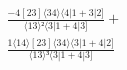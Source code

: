 \documentclass[varwidth, border=5pt]{standalone}
\begin{document}
\begin{my}
$\begin{gathered}
\scriptscriptstyle\frac{-4[23]⟨34⟩⟨4|1+3|2]}{⟨13⟩²⟨3|1+4|3]} +\\
\scriptscriptstyle\frac{1⟨14⟩[23]⟨34⟩⟨3|1+4|2]}{⟨13⟩³⟨3|1+4|3]} \phantom{+}
\end{gathered}$
\end{my}
\end{document}
